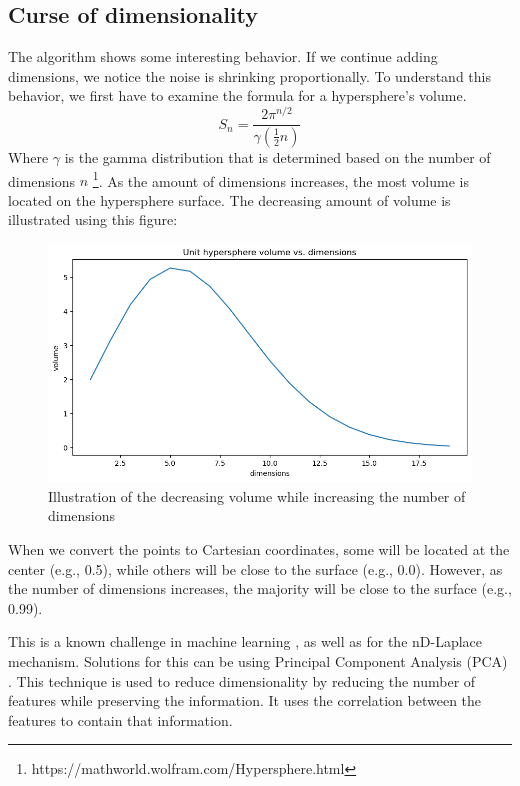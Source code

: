 \subsection{Curse of dimensionality}
The algorithm shows some interesting behavior.
If we continue adding dimensions, we notice the noise is shrinking proportionally.
To understand this behavior, we first have to examine the formula for a hypersphere’s volume.
\begin{equation}
  S_n = \frac{2 \pi^{n/2}}{\gamma(\frac{1}{2}n)}
\end{equation}
Where $\gamma$ is the gamma distribution that is determined based on the number of dimensions $n$ \footnote{https://mathworld.wolfram.com/Hypersphere.html}.
As the amount of dimensions increases, the most volume is located on the hypersphere surface.
The decreasing amount of volume is illustrated using this figure:
\begin{figure}
  \label{fig:curse-of-dimensionality}
  \includegraphics{TheorethicalFramework/ND-Laplace/Images/volume.png}
  \caption{Illustration of the decreasing volume while increasing the number of dimensions}
\end{figure}
When we convert the points to Cartesian coordinates, some will be located at the center (e.g., 0.5), while others will be close to the surface (e.g., 0.0).
However, as the number of dimensions increases, the majority will be close to the surface (e.g., 0.99).

This is a known challenge in machine learning , as well as for the nD-Laplace mechanism.
Solutions for this can be using Principal Component Analysis (PCA) \citep{gorban_high-dimensional_2020}.
This technique is used to reduce dimensionality by reducing the number of features while preserving the information.
It uses the correlation between the features to contain that information.